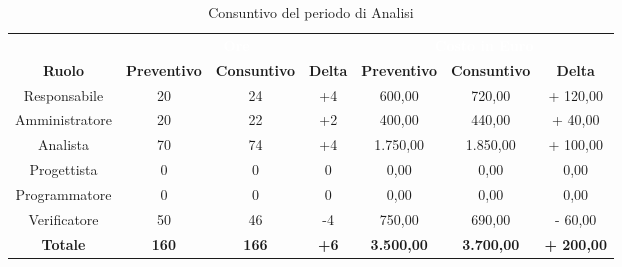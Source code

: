 \begin{table}[H]
\centering
\begin{tabular}{c|ccc|ccc}
\rowcolor{greySWEight}
\multicolumn{1}{c}{} & \multicolumn{3}{c}{\textcolor{white}{\textbf{Ore}}} & \multicolumn{3}{c}{\textcolor{white}{\textbf{Costo in Euro}}} \\
{\textbf{Ruolo}} & {\textbf{Preventivo}} & {\textbf{Consuntivo}} & {\textbf{Delta}} & {\textbf{Preventivo}} & {\textbf{Consuntivo}} & {\textbf{Delta}} \\
Responsabile & 20 & 24 & +4 &  600,00 &  720,00 & + 120,00 \\
Amministratore & 20 & 22 & +2 &  400,00 &  440,00 & + 40,00 \\
Analista & 70 & 74 & +4 &  1.750,00 &  1.850,00 & + 100,00 \\
Progettista & 0 & 0 & 0 &  0,00 &  0,00 &  0,00 \\
Programmatore & 0 & 0 & 0 &  0,00 &  0,00 &  0,00 \\
Verificatore & 50 & 46 & -4 &  750,00 &  690,00 & - 60,00 \\
\hline
\textbf{Totale} & \textbf{160} & \textbf{166} & \textbf{+6} &  \textbf{3.500,00} &  \textbf{3.700,00} & \textbf{+ 200,00} \\


\end{tabular}
\caption{Consuntivo del periodo di Analisi}
\end{table}
